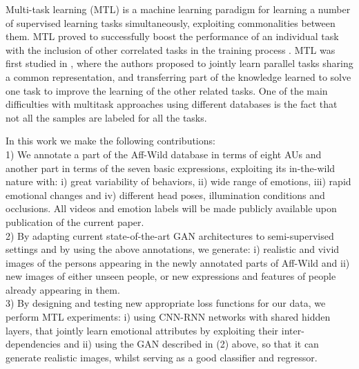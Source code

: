 \documentclass[a4paper, 10pt, conference]{ieeeconf}      %
\begin{document}
Multi-task learning (MTL) \cite{caruana1997multitask} is a machine learning paradigm for learning a number of supervised learning tasks simultaneously, exploiting commonalities between them. MTL proved to successfully boost the performance of an individual task with the inclusion of other correlated tasks in the training process \cite{ganin2014unsupervised}\cite{hinton2015distilling}.
MTL was first studied in \cite{caruana1997multitask}, where the authors proposed to jointly learn parallel tasks sharing a common representation, and transferring part of the knowledge learned to solve one task to improve the learning of the other related tasks. 
One of the main difficulties with multitask approaches using different databases is the fact that not all the samples are labeled for all the tasks.

In this work we make the following contributions: \\ %
1) We annotate a part of the Aff-Wild database in terms of eight AUs and another part in terms of the seven basic expressions, exploiting its in-the-wild nature with:  i) great variability of behaviors, ii) wide range of emotions, iii) rapid emotional changes and iv) different head poses, illumination conditions and occlusions. All videos and emotion labels will be made publicly available upon publication of the current paper.\\
2) By adapting current state-of-the-art GAN architectures to semi-supervised settings and by using the above annotations, we generate: i) realistic and vivid images of the persons appearing in the newly annotated parts of Aff-Wild and ii) new images of either unseen people, or new expressions and features of people already appearing in them.\\
3) By designing and testing new appropriate loss functions for our data, we perform MTL experiments: i) using CNN-RNN networks with shared hidden
layers, that jointly learn emotional attributes by exploiting their inter-dependencies and ii) using the GAN described in (2) above, so that it can generate realistic images, whilst serving as a good classifier and regressor.



\end{document}
